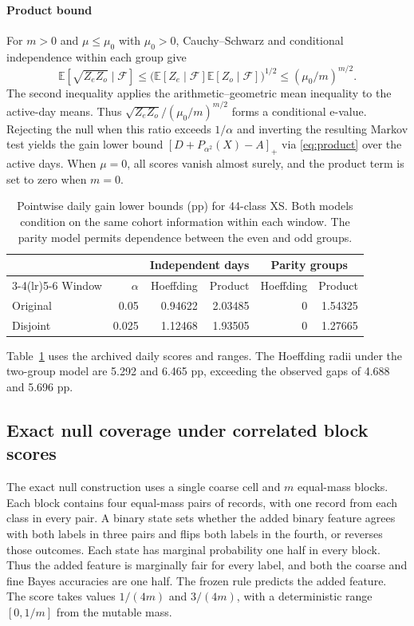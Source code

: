 \documentclass[preprint,11pt]{elsarticle}
\newcommand{\E}{\mathbb E}
\newcommand{\given}{\mathcal F}
\newcommand{\pos}[1]{\left[#1\right]_+}
\begin{document}
\paragraph{Product bound}
For $m>0$ and $\mu\le\mu_0$ with $\mu_0>0$, Cauchy--Schwarz and conditional independence within each group give
\[
\E[\sqrt{Z_e Z_o}\mid\given]
\le \bigl(\E[Z_e\mid\given]\E[Z_o\mid\given]\bigr)^{1/2}
\le (\mu_0/m)^{m/2}.
\]
The second inequality applies the arithmetic--geometric mean inequality to the active-day means. Thus $\sqrt{Z_eZ_o}/(\mu_0/m)^{m/2}$ forms a conditional e-value. Rejecting the null when this ratio exceeds $1/\alpha$ and inverting the resulting Markov test yields the gain lower bound $\pos{D+P_{\alpha^2}(X)-A}$ via \eqref{eq:product} over the active days. When $\mu=0$, all scores vanish almost surely, and the product term is set to zero when $m=0$.

\begin{table}[!ht]
\centering
\small
\setlength{\tabcolsep}{5pt}
\caption{Pointwise daily gain lower bounds (pp) for 44-class XS. Both models condition on the same cohort information within each window. The parity model permits dependence between the even and odd groups.}
\label{tab:daily-dependence}
\begin{tabular}{lrrrrr}
\toprule
 & & \multicolumn{2}{c}{Independent days} & \multicolumn{2}{c}{Parity groups} \\
\cmidrule(lr){3-4}\cmidrule(lr){5-6}
Window & $\alpha$ & Hoeffding & Product & Hoeffding & Product \\
\midrule
Original & 0.05  & 0.94622 & 2.03485 & 0 & 1.54325 \\
Disjoint & 0.025 & 1.12468 & 1.93505 & 0 & 1.27665 \\
\bottomrule
\end{tabular}
\end{table}

Table~\ref{tab:daily-dependence} uses the archived daily scores and ranges. The Hoeffding radii under the two-group model are 5.292 and 6.465 pp, exceeding the observed gaps of 4.688 and 5.696 pp.

\subsection{Exact null coverage under correlated block scores}

The exact null construction uses a single coarse cell and $m$ equal-mass blocks. Each block contains four equal-mass pairs of records, with one record from each class in every pair. A binary state sets whether the added binary feature agrees with both labels in three pairs and flips both labels in the fourth, or reverses those outcomes. Each state has marginal probability one half in every block. Thus the added feature is marginally fair for every label, and both the coarse and fine Bayes accuracies are one half. The frozen rule predicts the added feature. The score takes values $1/(4m)$ and $3/(4m)$, with a deterministic range $[0,1/m]$ from the mutable mass.
\end{document}

